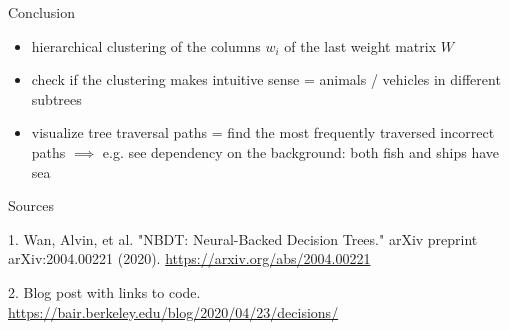 \documentclass{beamer}
\begin{document}
\begin{frame}{Conclusion}

\begin{itemize}
\item hierarchical clustering of the columns $w_i$ of the last weight matrix $W$
\item check if the clustering makes intuitive sense = animals / vehicles in different subtrees
\item visualize tree traversal paths = find the most frequently traversed incorrect paths $\implies$ e.g. see dependency on the background: both fish and ships have sea
\end{itemize}

\end{frame}


\begin{frame}{Sources}

\begin{thebibliography}{0}

   1. Wan, Alvin, et al. "NBDT: Neural-Backed Decision Trees." arXiv preprint arXiv:2004.00221 (2020). \url{https://arxiv.org/abs/2004.00221} 
  
   2. Blog post with links to code. \url{https://bair.berkeley.edu/blog/2020/04/23/decisions/}
  
\end{thebibliography}

\end{frame}

 
\end{document}
